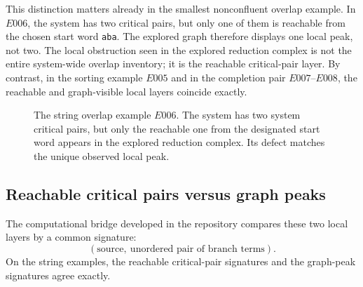 \documentclass[11pt]{article}
\numberwithin{equation}{section}
\theoremstyle{definition}
\theoremstyle{remark}
\begin{document}
This distinction matters already in the smallest nonconfluent overlap example. In $E006$, the system has two critical pairs, but only one of them is reachable from the chosen start word \texttt{aba}. The explored graph therefore displays one local peak, not two. The local obstruction seen in the explored reduction complex is not the entire system-wide overlap inventory; it is the reachable critical-pair layer. By contrast, in the sorting example $E005$ and in the completion pair $E007$--$E008$, the reachable and graph-visible local layers coincide exactly.

\begin{figure}[t]
    \centering
    \caption{The string overlap example $E006$. The system has two system critical pairs, but only the reachable one from the designated start word appears in the explored reduction complex. Its defect matches the unique observed local peak.}
    \label{fig:string-overlap-nonconfluent}
\end{figure}

\subsection{Reachable critical pairs versus graph peaks}
\label{subsec:reachable-critical-pairs-vs-peaks}

The computational bridge developed in the repository compares these two local layers by a common signature:
\[
(\text{source},\ \text{unordered pair of branch terms}).
\]
On the string examples, the reachable critical-pair signatures and the graph-peak signatures agree exactly.
\end{document}
